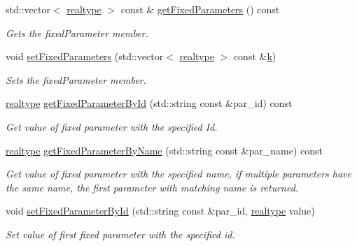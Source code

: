 \begin{DoxyCompactItemize}
std\+::vector$<$ \mbox{\hyperlink{namespaceamici_a1bdce28051d6a53868f7ccbf5f2c14a3}{realtype}} $>$ const  \& \mbox{\hyperlink{classamici_1_1_model_a76b24282a74eaca67d656149310dc07c}{get\+Fixed\+Parameters}} () const
\begin{DoxyCompactList}\small\item\em Gets the fixed\+Parameter member. \end{DoxyCompactList}\item 
void \mbox{\hyperlink{classamici_1_1_model_a14ba63ae81b4e8fa1f46884b703e2c30}{set\+Fixed\+Parameters}} (std\+::vector$<$ \mbox{\hyperlink{namespaceamici_a1bdce28051d6a53868f7ccbf5f2c14a3}{realtype}} $>$ const \&\mbox{\hyperlink{classamici_1_1_model_adde50e0d8a99d20354c8403bf93fab6f}{k}})
\begin{DoxyCompactList}\small\item\em Sets the fixed\+Parameter member. \end{DoxyCompactList}\item 
\mbox{\hyperlink{namespaceamici_a1bdce28051d6a53868f7ccbf5f2c14a3}{realtype}} \mbox{\hyperlink{classamici_1_1_model_acc647ebbeaf0be737c7c165fa77eeca5}{get\+Fixed\+Parameter\+By\+Id}} (std\+::string const \&par\+\_\+id) const
\begin{DoxyCompactList}\small\item\em Get value of fixed parameter with the specified Id. \end{DoxyCompactList}\item 
\mbox{\hyperlink{namespaceamici_a1bdce28051d6a53868f7ccbf5f2c14a3}{realtype}} \mbox{\hyperlink{classamici_1_1_model_a99cc00a08b2f2d87d3eac047d00a7c57}{get\+Fixed\+Parameter\+By\+Name}} (std\+::string const \&par\+\_\+name) const
\begin{DoxyCompactList}\small\item\em Get value of fixed parameter with the specified name, if multiple parameters have the same name, the first parameter with matching name is returned. \end{DoxyCompactList}\item 
void \mbox{\hyperlink{classamici_1_1_model_adc0d24343c6fed2e797fb402f7c2d256}{set\+Fixed\+Parameter\+By\+Id}} (std\+::string const \&par\+\_\+id, \mbox{\hyperlink{namespaceamici_a1bdce28051d6a53868f7ccbf5f2c14a3}{realtype}} value)
\begin{DoxyCompactList}\small\item\em Set value of first fixed parameter with the specified id. \end{DoxyCompactList}\item 

\end{DoxyCompactItemize}
